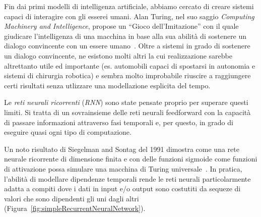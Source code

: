 Fin dai primi modelli di intelligenza artificiale, abbiamo cercato di creare sistemi capaci di interagire con gli esserei umani.
Alan Turing, nel suo saggio \emph{Computing Machinery and Intelligence}, propose un ``Gioco dell'Imitazione'' con il quale giudicare l'intelligenza di una macchina in base alla sua abilit\`a di sostenere un dialogo convincente con un essere umano~\cite{Turing:1950}.
Oltre a sistemi in grado di sostenere un dialogo convincente, ne esistono molti altri la cui realizzazione sarebbe altrettanto utile ed importante (es. automobili capaci di spostarsi in autonomia e sistemi di chirurgia robotica) e sembra molto improbabile riuscire a raggiungere certi risultati senza utlizzare una modellazione esplicita del tempo.

Le \emph{reti neurali ricorrenti} (\emph{RNN}) sono state pensate proprio per superare questi limiti.
Si tratta di un sovrainsieme delle reti neurali feedforward con la capacit\`a di passare informazioni attraverso fasi temporali e, per questo, in grado di eseguire quasi ogni tipo di computazione.

Un noto risultato di Siegelman and Sontag del 1991 dimostra come una rete neurale ricorrente di dimensione finita e con delle funzioni sigmoide come funzioni di attivazione possa simulare una macchina di Turing universale~\cite{Siegelmann:1991}.
In pratica, l'abilit\`a di modellare dipendenze temporali rende le reti neurali particolarmente adatta a compiti dove i dati in input e/o output sono costutiti da sequeze di valori che sono dipendenti gli uni dagli altri (Figura~\ref{fig:simpleRecurrentNeuralNetwork}).

